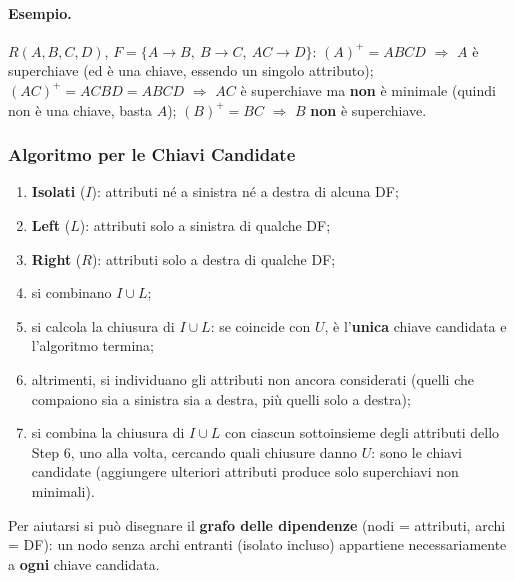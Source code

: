 \documentclass[12pt, a4paper]{article}
\begin{document}
\paragraph{Esempio.} $R(A,B,C,D)$, $F=\{A\to B,\ B\to C,\ AC\to D\}$: $(A)^+=ABCD$ $\Rightarrow$ $A$ è superchiave (ed è una chiave, essendo un singolo attributo); $(AC)^+=ACBD=ABCD$ $\Rightarrow$ $AC$ è superchiave ma \textbf{non} è minimale (quindi non è una chiave, basta $A$); $(B)^+=BC$ $\Rightarrow$ $B$ \textbf{non} è superchiave.

\subsubsection{Algoritmo per le Chiavi Candidate}
\begin{enumerate}
    \item \textbf{Isolati} ($I$): attributi né a sinistra né a destra di alcuna DF;
    \item \textbf{Left} ($L$): attributi solo a sinistra di qualche DF;
    \item \textbf{Right} ($R$): attributi solo a destra di qualche DF;
    \item si combinano $I \cup L$;
    \item si calcola la chiusura di $I\cup L$: se coincide con $U$, è l'\textbf{unica} chiave candidata e l'algoritmo termina;
    \item altrimenti, si individuano gli attributi non ancora considerati (quelli che compaiono sia a sinistra sia a destra, più quelli solo a destra);
    \item si combina la chiusura di $I \cup L$ con ciascun sottoinsieme degli attributi dello Step 6, uno alla volta, cercando quali chiusure danno $U$: sono le chiavi candidate (aggiungere ulteriori attributi produce solo superchiavi non minimali).
\end{enumerate}
Per aiutarsi si può disegnare il \textbf{grafo delle dipendenze} (nodi = attributi, archi = DF): un nodo senza archi entranti (isolato incluso) appartiene necessariamente a \textbf{ogni} chiave candidata.
\end{document}
